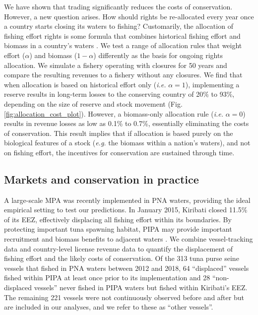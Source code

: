 \documentclass[12pt]{article}
\begin{document}
We have shown that trading significantly reduces the costs of conservation. However, a new question arises. How should rights be re-allocated every year once a country starts closing its waters to fishing? Customarily, the allocation of fishing effort rights is some formula that combines historical fishing effort and biomass in a country's waters \cite{havice_2013}. We test a range of allocation rules that weight effort ($\alpha$) and biomass ($1 - \alpha$) differently as the basis for ongoing rights allocation. We simulate a fishery operating with closures for 50 years and compare the resulting revenues to a fishery without any closures. We find that when allocation is based on historical effort only (\emph{i.e.} $\alpha = 1$), implementing a reserve results in long-term losses to the conserving country of 20\% to 93\%, depending on the size of reserve and stock movement (Fig. \ref{fig:allocation_cost_plot}). However, a biomass-only allocation rule (\emph{i.e.} $\alpha = 0$) results in revenue losses as low as 0.1\% to 0.7\%, essentially eliminating the costs of conservation. This result implies that if allocation is based purely on the biological features of a stock (\emph{e.g.} the biomass within a nation's waters), and not on fishing effort, the incentives for conservation are sustained through time.

\subsection{Markets and conservation in practice}

A large-scale MPA was recently implemented in PNA waters, providing the ideal empirical setting to test our predictions. In January 2015, Kiribati closed 11.5\% of its EEZ, effectively displacing all fishing effort within its boundaries\cite{mccauley_2016,mcdermott_2018}. By protecting important tuna spawning habitat, PIPA may provide important recruitment and biomass benefits to adjacent waters \cite{hernndez_2019}. We combine vessel-tracking data \cite{kroodsma_2018} and country-level license revenue data \cite{ffa_2017} to quantify the displacement of fishing effort and the likely costs of conservation. Of the 313 tuna purse seine vessels that fished in PNA waters between 2012 and 2018, 64 ``displaced'' vessels fished within PIPA at least once prior to its implementation and 28 ``non-displaced vessels'' never fished in PIPA waters but fished within Kiribati's EEZ. The remaining 221 vessels were not continuously observed before and after but are included in our analyses, and we refer to these as ``other vessels''.
\end{document}
